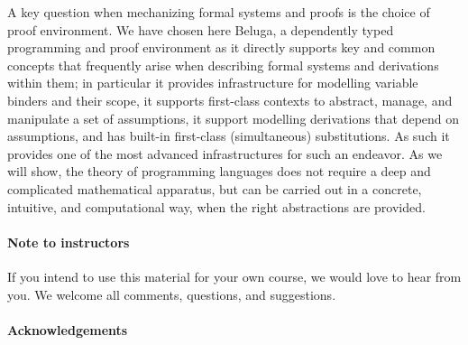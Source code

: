 A key question when mechanizing formal systems and proofs is the choice of proof environment.  We have chosen here Beluga, a dependently typed programming and proof environment as it directly supports key and common concepts that frequently arise when describing formal systems and derivations within them; in particular it provides infrastructure for modelling variable binders and their scope, it supports first-class contexts to abstract, manage, and manipulate a set of assumptions, it support modelling derivations that depend on assumptions, and has built-in first-class (simultaneous) substitutions.  As such it provides one of the most advanced infrastructures for such an endeavor. As we will show,  the theory of programming languages does
not require a deep and complicated mathematical apparatus, but can be carried out in a concrete, intuitive, and computational way, when the right abstractions are provided. 



\paragraph{Note to instructors}
If you intend to use this material for your own course, we would love to hear from you. We welcome all comments, questions, and suggestions.

\paragraph{Acknowledgements}


